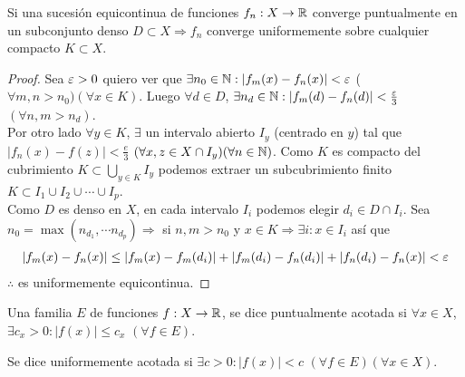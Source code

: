 \begin{theorem}
  Si una sucesión equicontinua de funciones \(f_n: X \to \mathbb{R} \) converge puntualmente en un subconjunto denso \(D \subset X \Rightarrow f_n\) converge uniformemente sobre cualquier compacto \(K \subset X\).

  \begin{proof}
    Sea \(\varepsilon > 0\) quiero ver que \(\exists n_0 \in \mathbb{N} : |f_m(x) - f_n(x)| < \varepsilon \) (\(\forall m, n > n_0)(\forall x \in K)\). Luego \(\forall d \in D\), \(\exists n_d \in \mathbb{N} : |f_m(d) - f_n(d)| < \frac{\varepsilon}{3} \) \((\forall n, m > n_d)\). \\
    Por otro lado \(\forall y \in K\), \(\exists \) un intervalo abierto \(I_y\) (centrado en \(y\)) tal que \(|f_n(x) - f(z)| < \frac{e}{3} \) \((\forall x, z \in X \cap I_y)(\forall n \in \mathbb{N})\). Como \(K\) es compacto del cubrimiento \(K \subset \bigcup_{y \in K} I_y\) podemos extraer un subcubrimiento finito \(K \subset I_1 \cup I_2 \cup \cdots \cup I_p\). \\
    Como \(D\) es denso en \(X\), en cada intervalo \(I_i\) podemos elegir \(d_i \in D \cap I_i\). Sea \(n_0 = \max(n_{d_1}, \cdots n_{d_p}) \Rightarrow \) si \(n, m > n_0\) y \(x \in K \Rightarrow \exists i : x \in I_i\) así que \begin{align*}
      |f_m(x) - f_n(x)| \leq |f_m(x) - f_m(d_i)| + |f_m(d_i) - f_n(d_i)| + |f_n(d_i) - f_n(x)| < \varepsilon
    \end{align*} \(\therefore \) es uniformemente equicontinua.
  \end{proof}
\end{theorem}

\begin{definition}
  Una familia \(E\) de funciones \(f: X \to \mathbb{R} \), se dice puntualmente acotada si \(\forall x \in X\), \(\exists c_x > 0 : |f(x)| \leq c_x\) \((\forall f \in E)\).
\end{definition}

\begin{definition}
  Se dice uniformemente acotada si \(\exists c > 0 : |f(x)| < c\) \((\forall f \in E)(\forall x \in X)\).
\end{definition}

\clearpage

